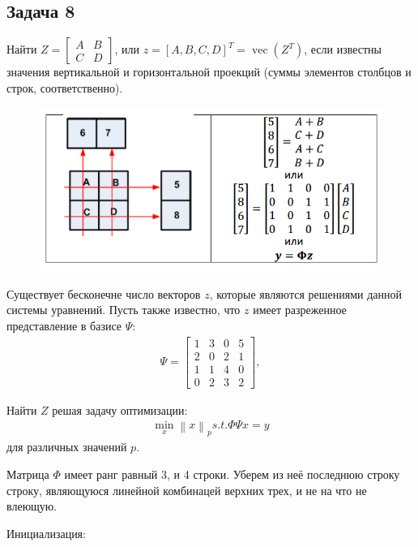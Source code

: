 \documentclass{article}
\DeclareMathOperator{\vect}{vec}
\newcommand{\norm}[1]{\left\lVert#1\right\rVert}
\begin{document}
    \bigbreak
    \subsection*{Задача 8}
    Найти $Z = \left[\begin{matrix} A & B \\ C & D \end{matrix} \right]$, 
    или $z = [A, B, C, D]^T = \vect(Z^T)$, если известны значения вертикальной и горизонтальной проекций (суммы элементов столбцов и строк, соответственно).  
    \begin{figure}[h!]
        \includegraphics[width=0.8\linewidth]{Screenshots/scheme8.png}
    \end{figure}
    
    Существует бесконечне число векторов $z$, которые являются решениями данной системы уравнений. Пусть также известно, что $z$ имеет разреженное представление в базисе $\Psi$:
    \begin{align*}
        \Psi = \left[
            \begin{matrix}
                1 & 3 & 0 & 5\\
                2 & 0 & 2 & 1\\
                1 & 1 & 4 & 0\\
                0 & 2 & 3 & 2
            \end{matrix}
            \right],
    \end{align*}
    
    Найти $Z$ решая задачу оптимизации:
    \begin{align*}
        \min_x \norm{x}_p s.t. \Phi \Psi x = y
    \end{align*}
    для различных значений $p$.
    
    Матрица $\Phi$ имеет ранг равный 3, и 4 строки. Уберем из неё последнюю строку строку, являющуюся линейной комбинацей верхних трех, и не на что не влеющую.
    \bigbreak
    
    Инициализация:
    
    \newpage
    
\end{document}
